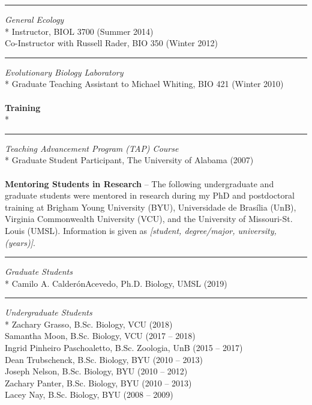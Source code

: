 \documentclass[margin,line]{res}
\begin{document}
\begin{resume}
\rule{-1mm}{5mm} \hspace*{4mm} {\textit{General Ecology}}\\*
\hspace*{8mm} Instructor, BIOL 3700 (Summer 2014)\\
\hspace*{8mm} Co-Instructor with Russell Rader, BIO 350 (Winter 2012)\\
\rule{-1mm}{5mm} \hspace*{4mm} {\textit{Evolutionary Biology Laboratory}}\\*
\hspace*{8mm} Graduate Teaching Assistant to Michael Whiting, BIO 421 (Winter 2010)\\
~\\
\textbf{Training}\\*
\rule{-1mm}{5mm} \hspace*{4mm} {\textit{Teaching Advancement Program (TAP) Course}}\\*
\hspace*{8mm} Graduate Student Participant, The University of Alabama (2007)\\
~\\
\textbf{Mentoring Students in Research} -- 
The following undergraduate and graduate students were mentored in research during my PhD and postdoctoral training at Brigham Young University (BYU), Universidade de Bras\'{i}lia (UnB), Virginia Commonwealth University (VCU), and the University of Missouri-St. Louis (UMSL). Information is given as \textit{[student, degree/major, university, (years)]}.~\\
\rule{-1mm}{5mm} \hspace*{4mm} {\textit{Graduate Students}}\\*
\hspace*{8mm} Camilo A. Calder\'{o}n\textendash Acevedo, Ph.D. Biology, UMSL (2019)\\
\rule{-1mm}{5mm} \hspace*{4mm} {\textit{Undergraduate Students}}\\*
\hspace*{8mm} Zachary Grasso, B.Sc. Biology, VCU (2018)\\
\hspace*{8mm} Samantha Moon, B.Sc. Biology, VCU (2017 -- 2018)\\
\hspace*{8mm} Ingrid Pinheiro Paschoaletto, B.Sc. Zoologia, UnB (2015 -- 2017)\\
\hspace*{8mm} Dean Trubschenck, B.Sc. Biology, BYU (2010 -- 2013)\\
\hspace*{8mm} Joseph Nelson, B.Sc. Biology, BYU (2010 -- 2012)\\
\hspace*{8mm} Zachary Panter, B.Sc. Biology, BYU (2010 -- 2013)\\
\hspace*{8mm} Lacey Nay, B.Sc. Biology, BYU (2008 -- 2009)\\



\end{resume}
\end{document}
